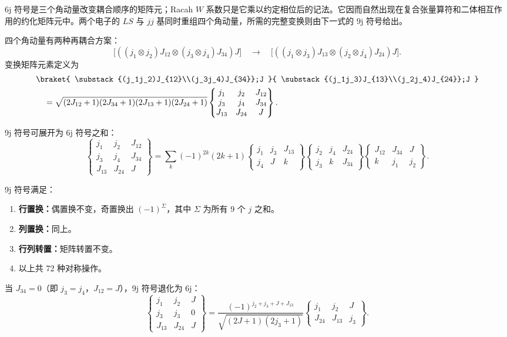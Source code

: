 6j 符号是三个角动量改变耦合顺序的矩阵元；Racah $W$ 系数只是它乘以约定相位后的记法。它因而自然出现在复合张量算符和二体相互作用的约化矩阵元中。两个电子的 $LS$ 与 $jj$ 基同时重组四个角动量，所需的完整变换则由下一式的 9j 符号给出。
\begin{definition}[9j 符号]
四个角动量有两种再耦合方案：
\[
\bigl[((j_1\otimes j_2)J_{12}\otimes(j_3\otimes j_4)J_{34})J\bigr]
\quad\to\quad
\bigl[((j_1\otimes j_3)J_{13}\otimes(j_2\otimes j_4)J_{24})J\bigr].
\]
变换矩阵元素定义为
\[
\begin{aligned}
&\braket{
\substack{(j_1j_2)J_{12}\\(j_3j_4)J_{34}};J
}{
\substack{(j_1j_3)J_{13}\\(j_2j_4)J_{24}};J
}\\
&\quad=
\sqrt{(2J_{12}+1)(2J_{34}+1)(2J_{13}+1)(2J_{24}+1)}
\begin{Bmatrix}j_1&j_2&J_{12}\\j_3&j_4&J_{34}\\J_{13}&J_{24}&J\end{Bmatrix}.
\end{aligned}
\]
\end{definition}
\begin{proposition}
9j 符号可展开为 6j 符号之和：
\[
\begin{Bmatrix}j_1&j_2&J_{12}\\j_3&j_4&J_{34}\\J_{13}&J_{24}&J\end{Bmatrix}
=\sum_k(-1)^{2k}(2k+1)
\begin{Bmatrix}j_1&j_3&J_{13}\\j_4&J&k\end{Bmatrix}
\begin{Bmatrix}j_2&j_4&J_{24}\\j_3&k&J_{34}\end{Bmatrix}
\begin{Bmatrix}J_{12}&J_{34}&J\\k&j_1&j_2\end{Bmatrix}.
\]
\end{proposition}
\begin{proposition}[9j 符号的对称性质]
9j 符号满足：
\begin{enumerate}[label=(\roman*),leftmargin=3em]
\item \textbf{行置换：}偶置换不变，奇置换出 $(-1)^{\Sigma}$，其中 $\Sigma$ 为所有 9 个 $j$ 之和。
\item \textbf{列置换：}同上。
\item \textbf{行列转置：}矩阵转置不变。
\item 以上共 72 种对称操作。
\end{enumerate}
\end{proposition}
当 $J_{34}=0$（即 $j_3=j_4$，$J_{12}=J$），9j 符号退化为 6j：
\[
\begin{Bmatrix}j_1&j_2&J\\j_3&j_3&0\\J_{13}&J_{24}&J\end{Bmatrix}
=\frac{(-1)^{j_2+j_3+J+J_{13}}}{\sqrt{(2J+1)(2j_3+1)}}
\begin{Bmatrix}j_1&j_2&J\\J_{24}&J_{13}&j_3\end{Bmatrix}.
\]

